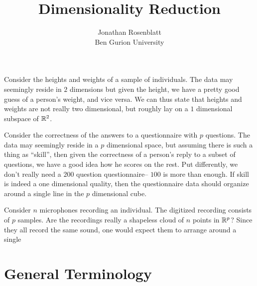 \documentclass[12pt,a4paper]{article}
\author{Jonathan Rosenblatt \\ Ben Gurion University}
\title{Dimensionality Reduction}
\begin{document}
\maketitle

\begin{example}[BMI]
	\label{ex:bmi}
	Consider the heights and weights of a sample of individuals. 
	The data may seemingly reside in $2$ dimensions but given the height, we have a pretty good guess of a person's weight, and vice versa. 
	We can thus state that heights and weights are not really two dimensional, but roughly lay on a $1$ dimensional subspace of $\mathbb{R}^2$. 
\end{example}


\begin{example}[IQ]
	\label{ex:iq}
	Consider the correctness of the answers to a questionnaire with $p$ questions. 
	The data may seemingly reside in a $p$ dimensional space, but assuming there is such a thing as ``skill'', then given the correctness of a person's reply to a subset of questions, we have a good idea how he scores on the rest. 
	Put differently, we don't really need a $200$ question questionnaire-- $100$ is more than enough.
	If skill is indeed a one dimensional quality, then the questionnaire data should organize around a single line in the $p$ dimensional cube. 
\end{example}


\begin{example}
	\label{ex:blind-signal}
	Consider $n$ microphones recording an individual. 
	The digitized recording consists of $p$ samples. 
	Are the recordings really a shapeless cloud of $n$ points in $\mathbb{R}^p$?
	Since they all record the same sound, one would expect them to arrange around a single 
\end{example}
		
	


\section{General Terminology}
\end{document}
